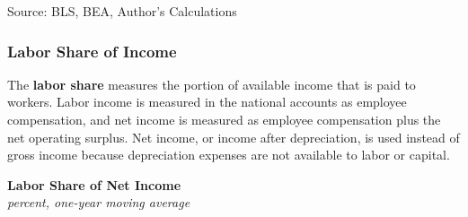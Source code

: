\documentclass{report}
\makeatletter
\newcommand{\tbllink}[1]{\href{https://raw.githubusercontent.com/bdecon/US-chartbook/master/chartbook/data/#1}{\faTable}}
\newcommand*\short[1]{\expandafter\@gobbletwo\number\numexpr#1\relax}
\newcommand{\absnode}[3]{\node[below right, align=left] at (axis cs: #1,#2) {#3};}
\newcommand{\shdateaxisticks}{
		date coordinates in=x, axis line style={draw=none},
		xmax={2024-01-31},
		max space between ticks=40,	    
		xtick={{1990-01-01}, {1995-01-01}, {2000-01-01}, 
			{2005-01-01}, {2010-01-01}, {2015-01-01}, {2020-01-01}},
		minor xtick={},
		enlarge y limits={0.06}, enlarge x limits={0.01},
		xticklabel style={align=center, yshift=-2pt}, tick label style={inner sep=0pt},
		}
\newcommand{\thickline}[4]{\addplot[ultra thick, no markers, color=#1] 
		table [x=#2, y=#3, col sep=comma] {#4};	}
\newcommand{\rbars}{
		\fill[color=black!10] (axis cs:{1990-07-01},\pgfkeysvalueof{/pgfplots/ymin})
			rectangle (axis cs:{1991-03-01}, \pgfkeysvalueof{/pgfplots/ymax});
		\fill[color=black!10] (axis cs:{2007-12-01},\pgfkeysvalueof{/pgfplots/ymin})
			rectangle (axis cs:{2009-07-01}, \pgfkeysvalueof{/pgfplots/ymax});
		\fill[color=black!10] (axis cs:{2001-03-01},\pgfkeysvalueof{/pgfplots/ymin})
			rectangle (axis cs:{2001-11-01}, \pgfkeysvalueof{/pgfplots/ymax});
		\fill[color=black!10] (axis cs:{2020-02-01},\pgfkeysvalueof{/pgfplots/ymin})
			rectangle (axis cs:{2020-05-01}, \pgfkeysvalueof{/pgfplots/ymax});}
\makeatother
\begin{document}
{\begin{minipage}{0.46\textwidth}
\footnotesize{Source: BLS, BEA, Author's Calculations} \hfill \tbllink{gli_mon.csv} \ \tbllink{gli_qtr.csv} \ \ 
\end{minipage} \hspace{5mm}
\begin{minipage}{0.255\textwidth}
\small 


\end{minipage}
\newpage
\vspace*{-11mm}

\begin{minipage}{1.0\textwidth}   
\subsubsection*{Labor Share of Income}
\small The \textbf{labor share} measures the portion of available income that is paid to workers. Labor income is measured in the national accounts as employee compensation, and net income is measured as employee compensation plus the net operating surplus. Net income, or income after depreciation, is used instead of gross income because depreciation expenses are not available to labor or capital. 
\end{minipage}
\vspace{-1mm}

\begin{minipage}{0.37\textwidth} 
\normalsize \textbf{Labor Share of Net Income}\\
\footnotesize{\textit{percent, one-year moving average}}
\vspace{3.5cm}

\hspace{3mm} 


\end{minipage}}
\end{document}
